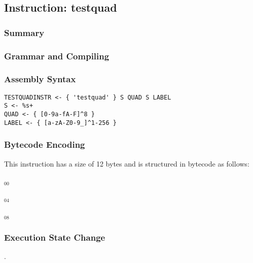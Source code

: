 \subsection{Instruction: testquad}

\subsubsection{Summary}


\subsubsection{Grammar and Compiling}


\subsubsection{Assembly Syntax}

\begin{myquote}
\begin{verbatim}
TESTQUADINSTR <- { 'testquad' } S QUAD S LABEL
S <- %s+
QUAD <- { [0-9a-fA-F]^8 }
LABEL <- { [a-zA-Z0-9_]^1-256 }
\end{verbatim}
\end{myquote}

\subsubsection{Bytecode Encoding}

This instruction has a size of 12 bytes and is structured in bytecode as follows:

$_{00}$\ 



$_{04}$\ 



$_{08}$\ 
\fbox{%
  \parbox{20pt}{%
00
  }%
}


\subsubsection{Execution State Change}

.


